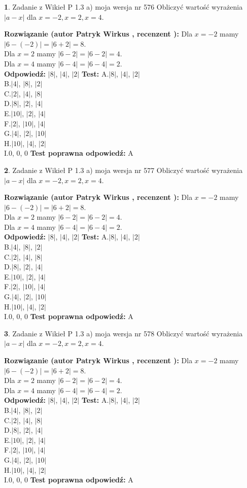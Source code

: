 \documentclass[12pt, a4paper]{article}
\theoremstyle{definition} %
\newtheorem{zad}{}
\newcommand{\zadStart}[1]{\begin{zad}#1\newline}
\newcommand{\zadStop}{\end{zad}}
\newcommand{\rozwStart}[2]{\noindent \textbf{Rozwiązanie (autor #1 , recenzent #2): }\newline}
\newcommand{\rozwStop}{\newline}
\newcommand{\odpStart}{\noindent \textbf{Odpowiedź:}\newline}
\newcommand{\odpStop}{\newline}
\newcommand{\testStart}{\noindent \textbf{Test:}\newline}
\newcommand{\testStop}{\newline}
\newcommand{\kluczStart}{\noindent \textbf{Test poprawna odpowiedź:}\newline}
\newcommand{\kluczStop}{\newline}
\begin{document}
\zadStart{Zadanie z Wikieł P 1.3 a) moja wersja nr 576}
Obliczyć wartość wyrażenia $|a - x|$ dla $x=-2,x=2,x=4$.
\zadStop
\rozwStart{Patryk Wirkus}{}
Dla $x = -2$ mamy $|6 - (-2)| = |6 + 2| = 8$.\\
Dla $x = 2$ mamy $|6 - 2| = |6 - 2| = 4$.\\
Dla $x = 4$ mamy $|6 - 4| = |6 - 4| = 2$.\\
\rozwStop
\odpStart
$|8|$, $|4|$, $|2|$
\odpStop
\testStart
A.$|8|$, $|4|$, $|2|$\\
B.$|4|$, $|8|$, $|2|$\\
C.$|2|$, $|4|$, $|8|$\\
D.$|8|$, $|2|$, $|4|$\\
E.$|10|$, $|2|$, $|4|$\\
F.$|2|$, $|10|$, $|4|$\\
G.$|4|$, $|2|$, $|10|$\\
H.$|10|$, $|4|$, $|2|$\\
I.$0$, $0$, $0$
\testStop
\kluczStart
A
\kluczStop



\zadStart{Zadanie z Wikieł P 1.3 a) moja wersja nr 577}
Obliczyć wartość wyrażenia $|a - x|$ dla $x=-2,x=2,x=4$.
\zadStop
\rozwStart{Patryk Wirkus}{}
Dla $x = -2$ mamy $|6 - (-2)| = |6 + 2| = 8$.\\
Dla $x = 2$ mamy $|6 - 2| = |6 - 2| = 4$.\\
Dla $x = 4$ mamy $|6 - 4| = |6 - 4| = 2$.\\
\rozwStop
\odpStart
$|8|$, $|4|$, $|2|$
\odpStop
\testStart
A.$|8|$, $|4|$, $|2|$\\
B.$|4|$, $|8|$, $|2|$\\
C.$|2|$, $|4|$, $|8|$\\
D.$|8|$, $|2|$, $|4|$\\
E.$|10|$, $|2|$, $|4|$\\
F.$|2|$, $|10|$, $|4|$\\
G.$|4|$, $|2|$, $|10|$\\
H.$|10|$, $|4|$, $|2|$\\
I.$0$, $0$, $0$
\testStop
\kluczStart
A
\kluczStop



\zadStart{Zadanie z Wikieł P 1.3 a) moja wersja nr 578}
Obliczyć wartość wyrażenia $|a - x|$ dla $x=-2,x=2,x=4$.
\zadStop
\rozwStart{Patryk Wirkus}{}
Dla $x = -2$ mamy $|6 - (-2)| = |6 + 2| = 8$.\\
Dla $x = 2$ mamy $|6 - 2| = |6 - 2| = 4$.\\
Dla $x = 4$ mamy $|6 - 4| = |6 - 4| = 2$.\\
\rozwStop
\odpStart
$|8|$, $|4|$, $|2|$
\odpStop
\testStart
A.$|8|$, $|4|$, $|2|$\\
B.$|4|$, $|8|$, $|2|$\\
C.$|2|$, $|4|$, $|8|$\\
D.$|8|$, $|2|$, $|4|$\\
E.$|10|$, $|2|$, $|4|$\\
F.$|2|$, $|10|$, $|4|$\\
G.$|4|$, $|2|$, $|10|$\\
H.$|10|$, $|4|$, $|2|$\\
I.$0$, $0$, $0$
\testStop
\kluczStart
A
\kluczStop
\end{document}
